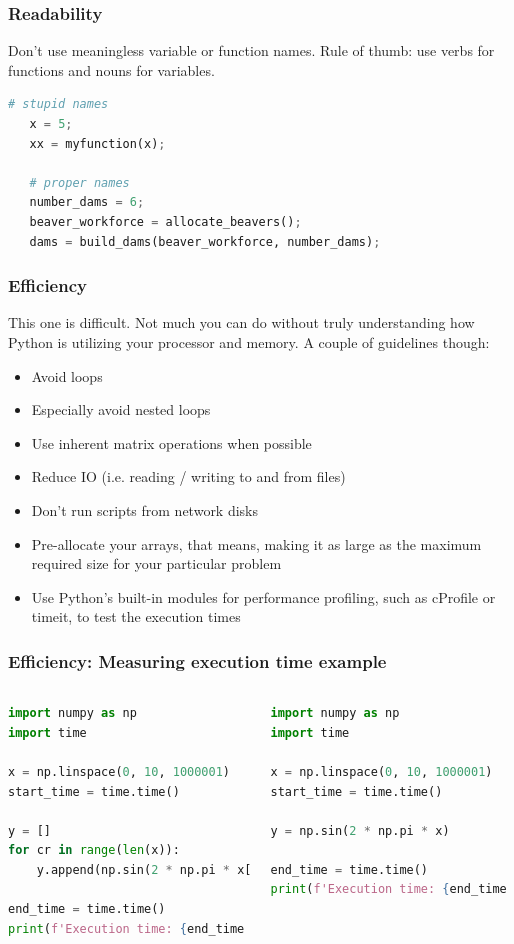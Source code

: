 \begin{frame}[fragile]
  \frametitle{Readability}
  Don't use meaningless variable or function names. Rule of thumb: use verbs for functions and nouns for variables.
  \vspace*{2em}
  \begin{lstlisting}[language=Python]
   # stupid names
   x = 5;
   xx = myfunction(x);
   
   # proper names
   number_dams = 6;
   beaver_workforce = allocate_beavers();
   dams = build_dams(beaver_workforce, number_dams);
  \end{lstlisting}
\end{frame}

\begin{frame}[fragile]
  \frametitle{Efficiency}
  This one is difficult. Not much you can do without truly understanding how Python is utilizing your processor and memory. A couple of guidelines though:
  \begin{itemize}
      \item Avoid loops
      \item Especially avoid nested loops
      \item Use inherent matrix operations when possible
      \item Reduce IO (i.e. reading / writing to and from files)
      \item Don't run scripts from network disks
      \item Pre-allocate your arrays, that means, making it as large as the maximum required size for your particular problem
      \item Use Python's built-in modules for performance profiling, such as cProfile or timeit, to test the execution times
  \end{itemize}
\end{frame}

\begin{frame}[fragile]
  \frametitle{Efficiency: Measuring execution time example}
  \begin{columns}
    \begin{lstlisting}[language=Python]
import numpy as np
import time

x = np.linspace(0, 10, 1000001)
start_time = time.time()

y = []
for cr in range(len(x)):
    y.append(np.sin(2 * np.pi * x[cr]))

end_time = time.time()
print(f'Execution time: {end_time - start_time} seconds')
    \end{lstlisting}
    \begin{lstlisting}[language=Python]
import numpy as np
import time

x = np.linspace(0, 10, 1000001)
start_time = time.time()

y = np.sin(2 * np.pi * x)

end_time = time.time()
print(f'Execution time: {end_time - start_time} seconds')
    \end{lstlisting}
  \end{columns}
\end{frame}


